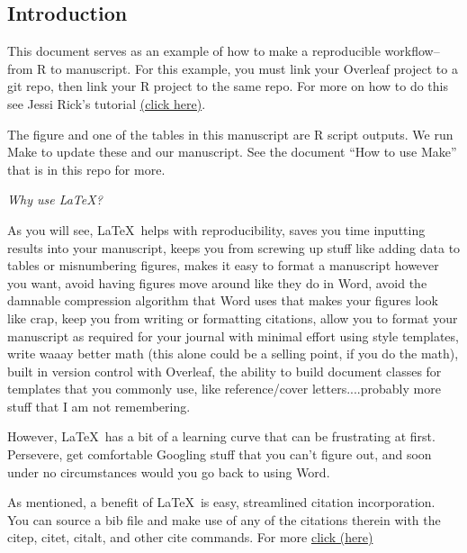 \begin{linenumbers} %
\section*{Introduction} %

This document serves as an example of how to make a reproducible workflow--from R to manuscript. 
For this example, you must link your Overleaf project to a git repo, then link your R project to the same repo. For more on how to do this see Jessi Rick's tutorial \href{https://github.com/jessicarick/resources}{(click here)}.

The figure and one of the tables in this manuscript are R script outputs. We run Make to update these and our manuscript. See the document ``How to use Make'' that is in this repo for more. 
\begin{center}
    \emph{Why use \LaTeX?}
\end{center}

As you will see, \LaTeX\ helps with reproducibility, saves you time inputting results into your manuscript, keeps you from screwing up stuff like adding data to tables or misnumbering figures, makes it easy to format a manuscript however you want, avoid having figures move around like they do in Word, avoid the damnable compression algorithm that Word uses that makes your figures look like crap, keep you from writing or formatting citations, allow you to format your manuscript as required for your journal with minimal effort using style templates, write waaay better math (this alone could be a selling point, if you do the math), built in version control with Overleaf, the ability to build document classes for templates that you commonly use, like reference/cover letters....probably more stuff that I am not remembering. 

However, \LaTeX\ has a bit of a learning curve that can be frustrating at first. Persevere, get comfortable Googling stuff that you can't figure out, and soon under no circumstances would you go back to using Word. 

As mentioned, a benefit of \LaTeX\  is easy, streamlined citation incorporation. You can source a bib file and make use of any of the citations therein with the citep, citet, citalt, and other cite commands. For more \href{https://www.imperial.ac.uk/media/imperial-college/administration-and-support-services/library/public/LaTeX-and-BibTeX-branded-jan-2016.pdf}{click (here)}


\end{linenumbers}
